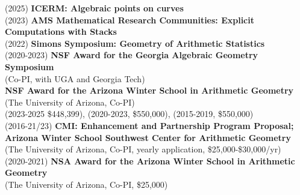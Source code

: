 \documentclass[margin,line]{res}
\begin{document}
\begin{resume}
(2025) \textbf{ICERM: Algebraic points on curves}\vspace{.15cm}\\
(2023) \textbf{AMS Mathematical Research Communities: Explicit Computations with Stacks}\vspace{.15cm}\\
(2022) \textbf{Simons Symposium: Geometry of Arithmetic Statistics}  \vspace{.15cm}\\
(2020-2023)  \textbf{NSF Award for the Georgia Algebraic Geometry Symposium}\\
  \vspace{5pt} (Co-PI, with UGA and Georgia Tech) \vspace{.05cm}\\
\textbf{NSF Award for the Arizona Winter School in Arithmetic Geometry}\\
    \vspace{1pt}   (The University of Arizona, Co-PI) \\
    \vspace{5pt}   (2023-2025 \$448,399), (2020-2023, \$550,000), (2015-2019, \$550,000) \vspace{.05cm}\\
(2016-21/23) \textbf{CMI: Enhancement and Partnership Program Proposal; Arizona Winter School Southwest Center for Arithmetic Geometry}\\
    \vspace{5pt} (The University of Arizona, Co-PI, yearly application, \$25,000-\$30,000/yr) \vspace{.05cm}\\
(2020-2021)  \textbf{NSA Award for the Arizona Winter School in Arithmetic Geometry}\\
    \vspace{5pt} (The University of Arizona, Co-PI, \$25,000) \vspace{.05cm}\\


\end{resume}
\end{document}
